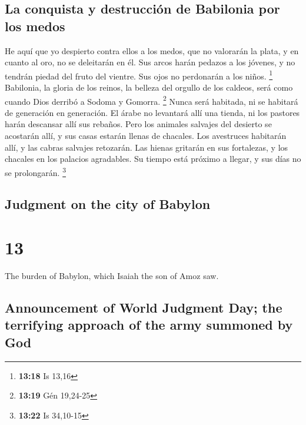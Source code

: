 \begin{paracol}{2}
\hypertarget{la-conquista-y-destrucciuxf3n-de-babilonia-por-los-medos}{%
\subsection{La conquista y destrucción de Babilonia por los
medos}\label{la-conquista-y-destrucciuxf3n-de-babilonia-por-los-medos}}

 He aquí que yo despierto contra ellos a los medos, que
no valorarán la plata, y en cuanto al oro, no se deleitarán en él.
 Sus arcos harán pedazos a los jóvenes, y no tendrán
piedad del fruto del vientre. Sus ojos no perdonarán a los niños.
\footnote{\textbf{13:18} Is 13,16}  Babilonia, la gloria
de los reinos, la belleza del orgullo de los caldeos, será como cuando
Dios derribó a Sodoma y Gomorra. \footnote{\textbf{13:19} Gén 19,24-25}
 Nunca será habitada, ni se habitará de generación en
generación. El árabe no levantará allí una tienda, ni los pastores harán
descansar allí sus rebaños.  Pero los animales salvajes
del desierto se acostarán allí, y sus casas estarán llenas de chacales.
Los avestruces habitarán allí, y las cabras salvajes retozarán.
 Las hienas gritarán en sus fortalezas, y los chacales en
los palacios agradables. Su tiempo está próximo a llegar, y sus días no
se prolongarán. \footnote{\textbf{13:22} Is 34,10-15}

\switchcolumn
\begin{otherlanguage}{english}

\hypertarget{judgment-on-the-city-of-babylon}{%
\subsection{Judgment on the city of
Babylon}\label{judgment-on-the-city-of-babylon}}

\hypertarget{section-25}{%
\section{13}\label{section-25}}

 The burden of Babylon, which Isaiah the son of Amoz saw.

\hypertarget{announcement-of-world-judgment-day-the-terrifying-approach-of-the-army-summoned-by-god}{%
\subsection{Announcement of World Judgment Day; the terrifying approach
of the army summoned by
God}\label{announcement-of-world-judgment-day-the-terrifying-approach-of-the-army-summoned-by-god}}


\end{otherlanguage}
\end{paracol}
